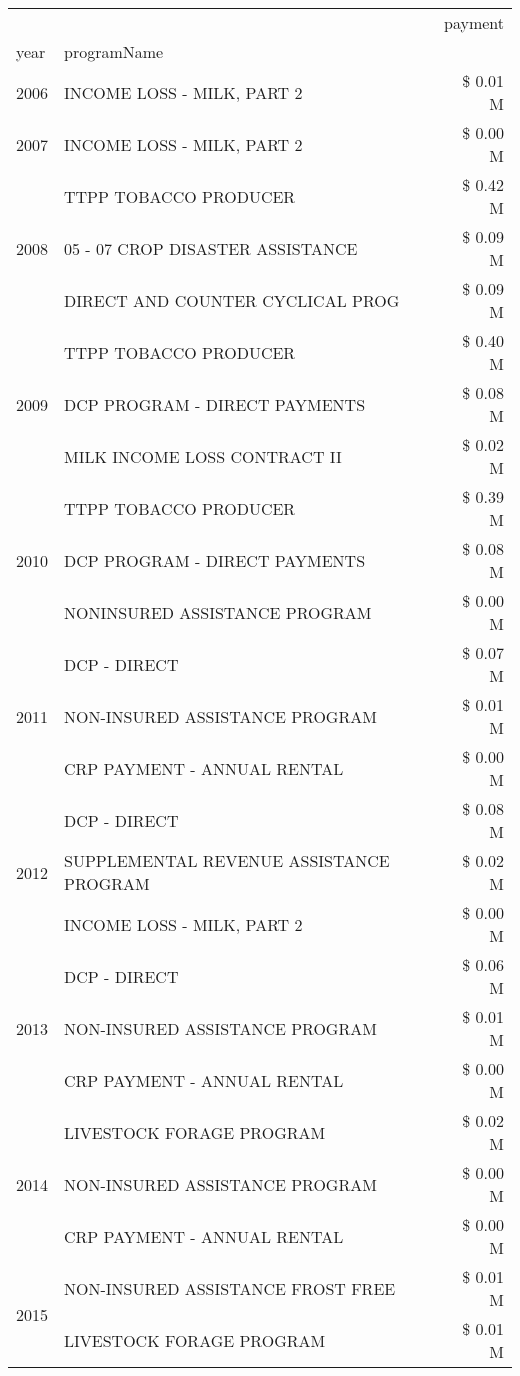 \begin{tabular}{llr}
\toprule
 &  & payment \\
year & programName &  \\
\midrule
2006 & INCOME LOSS - MILK, PART 2 & \$ 0.01 M \\
\cline{1-3}
2007 & INCOME LOSS - MILK, PART 2 & \$ 0.00 M \\
\cline{1-3}
\multirow[t]{3}{*}{2008} & TTPP TOBACCO PRODUCER & \$ 0.42 M \\
 & 05 - 07 CROP DISASTER ASSISTANCE & \$ 0.09 M \\
 & DIRECT AND COUNTER CYCLICAL PROG & \$ 0.09 M \\
\cline{1-3}
\multirow[t]{3}{*}{2009} & TTPP TOBACCO PRODUCER & \$ 0.40 M \\
 & DCP PROGRAM - DIRECT PAYMENTS & \$ 0.08 M \\
 & MILK INCOME LOSS CONTRACT II & \$ 0.02 M \\
\cline{1-3}
\multirow[t]{3}{*}{2010} & TTPP TOBACCO PRODUCER & \$ 0.39 M \\
 & DCP PROGRAM - DIRECT PAYMENTS & \$ 0.08 M \\
 & NONINSURED ASSISTANCE PROGRAM & \$ 0.00 M \\
\cline{1-3}
\multirow[t]{3}{*}{2011} & DCP - DIRECT & \$ 0.07 M \\
 & NON-INSURED ASSISTANCE PROGRAM & \$ 0.01 M \\
 & CRP PAYMENT - ANNUAL RENTAL & \$ 0.00 M \\
\cline{1-3}
\multirow[t]{3}{*}{2012} & DCP - DIRECT & \$ 0.08 M \\
 & SUPPLEMENTAL REVENUE ASSISTANCE PROGRAM & \$ 0.02 M \\
 & INCOME LOSS - MILK, PART 2 & \$ 0.00 M \\
\cline{1-3}
\multirow[t]{3}{*}{2013} & DCP - DIRECT & \$ 0.06 M \\
 & NON-INSURED ASSISTANCE PROGRAM & \$ 0.01 M \\
 & CRP PAYMENT - ANNUAL RENTAL & \$ 0.00 M \\
\cline{1-3}
\multirow[t]{3}{*}{2014} & LIVESTOCK FORAGE PROGRAM & \$ 0.02 M \\
 & NON-INSURED ASSISTANCE PROGRAM & \$ 0.00 M \\
 & CRP PAYMENT - ANNUAL RENTAL & \$ 0.00 M \\
\cline{1-3}
\multirow[t]{3}{*}{2015} & NON-INSURED ASSISTANCE FROST FREE & \$ 0.01 M \\
 & LIVESTOCK FORAGE PROGRAM & \$ 0.01 M \\

\end{tabular}
